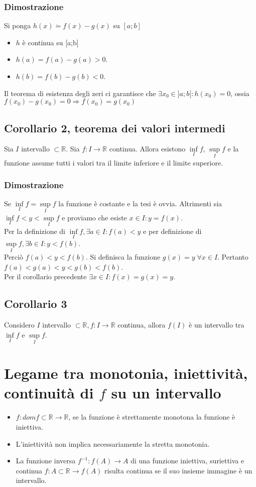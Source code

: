 \subsubsection{Dimostrazione}
Si ponga $h(x)\dot{=}f(x)-g(x)$ su $[a;b]$
\begin{itemize}
\item $h$ \`e continua su [a;b]
\item $h(a)=f(a)-g(a)>0$.
\item $h(b)=f(b)-g(b)<0$.
\end{itemize}
Il teorema di esistenza degli zeri ci garantisce che $\exists x_0\in ]a;b[:h(x_0)=0$, ossia $f(x_0)-g(x_0)=0\Rightarrow f(x_0)=g(x_0)$
\subsection{Corollario 2, teorema dei valori intermedi}
Sia $I$ intervallo $\subset\mathbb{R}$. Sia $f:I\rightarrow\mathbb{R}$ continua. Allora esistono $\inf\limits_I f$, $\sup\limits_I f$ e la funzione assume tutti i valori 
tra il limite inferiore e il limite superiore.
\subsubsection{Dimostrazione}
Se $\inf\limits_I f=\sup\limits_I f$ la funzione \`e costante e la tesi \`e ovvia. Altrimenti sia $\inf\limits_I f<y<\sup\limits_I f$ e proviamo che esiste $x\in I:y=f(x)$.\\
Per la definizione di $\inf\limits_I f,\exists a\in I:f(a)<y$ e per definizione di $\sup\limits_I f, \exists b\in I:y<f(b)$.\\
Perci\`o $f(a)<y<f(b)$. Si definisca la funzione $g(x)=y\;\forall x\in I$. Pertanto $f(a)<g(a)<y<g(b)<f(b)$.\\
Per il corollario precedente $\exists x\in I:f(x)=g(x)=y$.
\subsection{Corollario 3}
Considero $I$ intervallo $\subset\mathbb{R},f:I\rightarrow\mathbb{R}$ continua, allora $f(I)$ \`e un intervallo tra $\inf\limits_I f$ e $\sup\limits_I f$.
\section{Legame tra monotonia, iniettivit\`a, continuit\`a di $f$ su un intervallo}
\begin{itemize}
\item $f:domf\subset\mathbb{R}\rightarrow\mathbb{R}$, se la funzione \`e strettamente monotona la funzione \`e iniettiva.
\item L'iniettivit\`a non implica necessariamente la stretta monotonia.
\item La funzione inversa $f^{-1}:f(A)\rightarrow A$ di una funzione iniettiva, suriettiva e continua $f:A\subset\mathbb{R}\rightarrow f(A)$ risulta continua se il suo 
insieme immagine \`e un intervallo.
\end{itemize}
